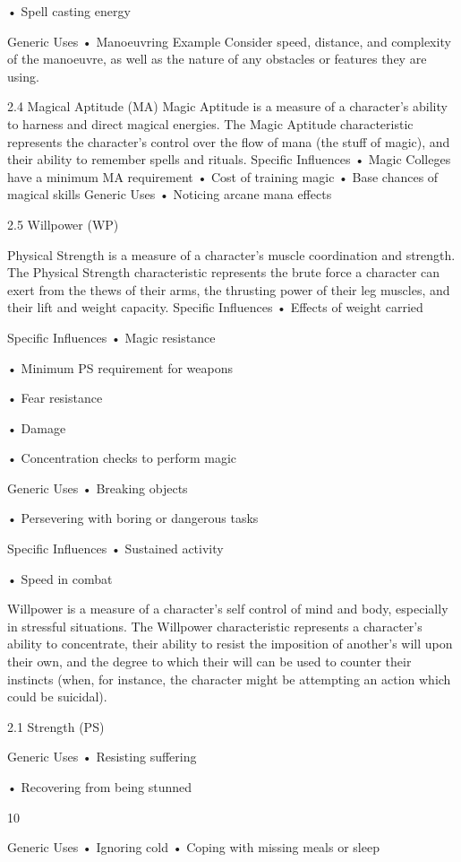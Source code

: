 \documentclass[a4paper]{article}
\begin{document}
\begin{multicols}{3}
• Spell casting energy

Generic Uses
• Manoeuvring
Example
Consider speed, distance, and complexity
of the manoeuvre, as well as the nature of any obstacles or
features they are using.

2.4 Magical Aptitude (MA)
Magic Aptitude is a measure of a character’s ability to harness and direct magical energies. The
Magic Aptitude characteristic represents the character’s control over the flow of mana (the stuff of
magic), and their ability to remember spells and
rituals.
Specific Influences
• Magic Colleges have a minimum MA requirement
• Cost of training magic
• Base chances of magical skills
Generic Uses
• Noticing arcane mana effects

2.5 Willpower (WP)

Physical Strength is a measure of a character’s
muscle coordination and strength. The Physical
Strength characteristic represents the brute force a
character can exert from the thews of their arms,
the thrusting power of their leg muscles, and their
lift and weight capacity.
Specific Influences
• Effects of weight carried

Specific Influences
• Magic resistance

• Minimum PS requirement for weapons

• Fear resistance

• Damage

• Concentration checks to perform magic

Generic Uses
• Breaking objects

• Persevering with boring or dangerous tasks

Specific Influences
• Sustained activity

• Speed in combat

Willpower is a measure of a character’s self control
of mind and body, especially in stressful situations.
The Willpower characteristic represents a character’s ability to concentrate, their ability to resist the
imposition of another’s will upon their own, and
the degree to which their will can be used to
counter their instincts (when, for instance, the
character might be attempting an action which
could be suicidal).

2.1 Strength (PS)

Generic Uses
• Resisting suffering

• Recovering from being stunned

10

Generic Uses
• Ignoring cold
• Coping with missing meals or sleep


\end{multicols}
\end{document}
